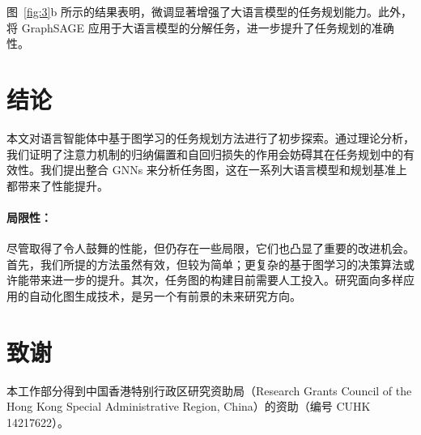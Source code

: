 \documentclass[11pt,UTF8,fontset=fandol]{ctexart}
\begin{document}
图~\ref{fig:3}b 所示的结果表明，微调显著增强了大语言模型的任务规划能力。此外，将 GraphSAGE 应用于大语言模型的分解任务，进一步提升了任务规划的准确性。

\section{结论}

本文对语言智能体中基于图学习的任务规划方法进行了初步探索。通过理论分析，我们证明了注意力机制的归纳偏置和自回归损失的作用会妨碍其在任务规划中的有效性。我们提出整合 GNNs 来分析任务图，这在一系列大语言模型和规划基准上都带来了性能提升。

\paragraph{局限性：}尽管取得了令人鼓舞的性能，但仍存在一些局限，它们也凸显了重要的改进机会。首先，我们所提的方法虽然有效，但较为简单；更复杂的基于图学习的决策算法或许能带来进一步的提升。其次，任务图的构建目前需要人工投入。研究面向多样应用的自动化图生成技术，是另一个有前景的未来研究方向。

\section*{致谢}

本工作部分得到中国香港特别行政区研究资助局（Research Grants Council of the Hong Kong Special Administrative Region, China）的资助（编号 CUHK 14217622）。
\end{document}
